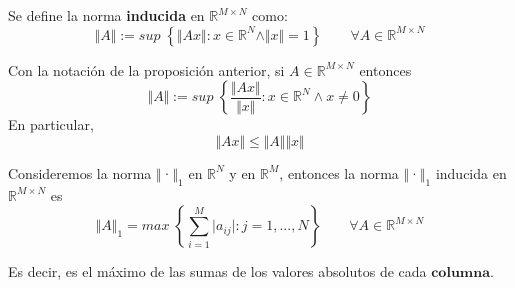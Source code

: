 \begin{ndef}
Se define la norma \textbf{inducida} en $\mathbb{R}^{M \times N}$ como:
\[ \Vert A \Vert := sup \; \left\lbrace \Vert Ax \Vert : x \in \mathbb{R}^N \wedge \Vert x \Vert = 1 \right\rbrace \qquad \forall A \in \mathbb{R}^{M \times N} \]
\end{ndef}

\begin{nprop}
Con la notación de la proposición anterior, si $A \in \mathbb{R}^{M \times N}$ entonces
\[ \Vert A \Vert := sup \; \left\lbrace \frac{\Vert Ax \Vert}{\Vert x \Vert } : x \in \mathbb{R}^N \wedge x \neq 0 \right\rbrace \]
En particular,
\[ \Vert Ax \Vert \leq \Vert A \Vert \Vert x \Vert \]
\end{nprop}

\begin{nprop}
Consideremos la norma $\Vert$·$\Vert _1$ en $\mathbb{R}^N$ y en $\mathbb{R}^M$, entonces la norma $\Vert$·$\Vert _1$ inducida en $\mathbb{R}^{M \times N}$ es
\[ \Vert A \Vert _1 = max \; \left\lbrace \sum_{i=1}^M \vert a_{ij} \vert : j = 1,...,N \right\rbrace \qquad \forall A \in \mathbb{R}^{M \times N} \]
\end{nprop}

Es decir, es el máximo de las sumas de los valores absolutos de cada $\textbf{columna}$.

